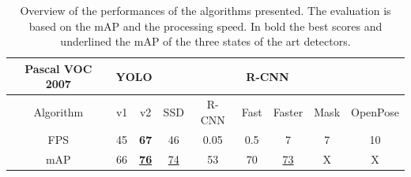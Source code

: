 \begin{table}[!h]
	\centering
	\begin{tabular}{|c|c|c|c|c|c|c|c|c|}
		\hline
		Pascal VOC 2007 & \multicolumn{2}{c|}{YOLO} &     & \multicolumn{4}{c|}{R-CNN}   &          \\ \hline
		Algorithm       & v1          & v2          & SSD & R-CNN & Fast & Faster & Mask & OpenPose \\ \hline
		FPS             & 45          & \textbf{67}          & 46  & 0.05  & 0.5  & 7      & 7    & 10       \\ \hline
		mAP             & 66          & \underline{\textbf{76}}          & \underline{74}  & 53    & 70   & \underline{73}     & X    & X        \\ \hline
	\end{tabular}
	\caption{Overview of the performances of the algorithms presented. The evaluation is based on the mAP and the processing speed. In bold the best scores and underlined the mAP of the three states of the art detectors.}
	\label{tab:detectionPerformances}
\end{table}
